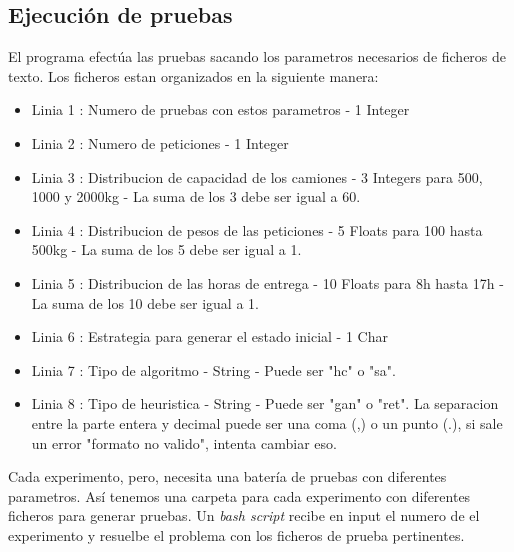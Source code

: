 \documentclass{article}
\begin{document}
\subsection{Ejecución de pruebas}
El programa efectúa las pruebas sacando los parametros necesarios de ficheros de texto. Los ficheros estan organizados en la siguiente manera:
\begin{itemize}
\item Linia 1 : Numero de pruebas con estos parametros - 1 Integer
\item Linia 2 : Numero de peticiones - 1 Integer
\item Linia 3 : Distribucion de capacidad de los camiones - 3 Integers para 500, 1000 y 2000kg - La suma de los 3 debe ser igual a 60.
\item Linia 4 : Distribucion de pesos de las peticiones - 5 Floats para 100 hasta 500kg - La suma de los 5 debe ser igual a 1.
\item Linia 5 : Distribucion de las horas de entrega - 10 Floats para 8h hasta 17h - La suma de los 10 debe ser igual a 1.
\item Linia 6 : Estrategia para generar el estado inicial - 1 Char
\item Linia 7 : Tipo de algoritmo - String - Puede ser "hc" o "sa".
\item Linia 8 : Tipo de heuristica - String - Puede ser "gan" o "ret".
La separacion entre la parte entera y decimal puede ser una coma (,) o un punto (.), si sale un error "formato no valido", intenta cambiar eso.
\end{itemize}
Cada experimento, pero, necesita una batería de pruebas con diferentes parametros. Así tenemos una carpeta para cada experimento con diferentes ficheros para generar pruebas. Un {\it bash script} recibe en input el numero de el experimento y resuelbe el problema con los ficheros de prueba pertinentes.
\end{document}
